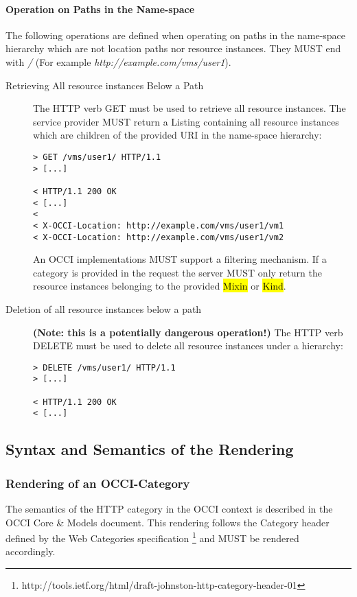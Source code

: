 \documentclass[10pt,a4paper]{article}
\begin{document}
\paragraph{Operation on Paths in the Name-space}
The following operations are defined when operating on paths in the
name-space hierarchy which are not location paths nor resource
instances. They MUST end with \emph{/} (For example
\emph{http://example.com/vms/user1}).

\begin{description}
\item[Retrieving All resource instances Below a Path] The HTTP verb
  GET must be used to retrieve all resource instances. The service
  provider MUST return a Listing containing all resource instances
  which are children of the provided URI in the name-space hierarchy:
\begin{verbatim}
> GET /vms/user1/ HTTP/1.1
> [...]
 
< HTTP/1.1 200 OK
< [...]
< 
< X-OCCI-Location: http://example.com/vms/user1/vm1
< X-OCCI-Location: http://example.com/vms/user1/vm2
\end{verbatim}
An OCCI implementations MUST support a filtering mechanism. If a
category is provided in the request the server MUST only return the
resource instances belonging to the provided \hl{Mixin} or \hl{Kind}.

\item[Deletion of all resource instances below a path] \textbf{(Note:
  this is a potentially dangerous operation!)} The HTTP verb DELETE
  must be used to delete all resource instances under a hierarchy:
\begin{verbatim}
> DELETE /vms/user1/ HTTP/1.1
> [...]
 
< HTTP/1.1 200 OK
< [...]
\end{verbatim}
\end{description}

\subsection{Syntax and Semantics of the Rendering}
\label{sec:syntax}

\subsubsection{Rendering of an OCCI-Category}
The semantics of the HTTP category in the OCCI context is described in the
OCCI Core \& Models document. This rendering follows the
  Category header defined by the Web Categories specification
  \footnote{http://tools.ietf.org/html/draft-johnston-http-category-header-01} 
  and MUST be rendered accordingly.
\end{document}
